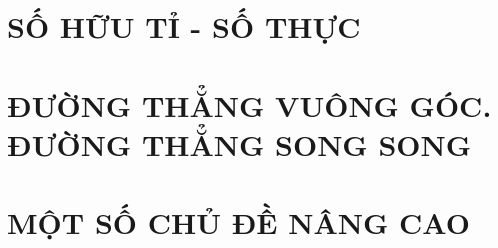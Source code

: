 \documentclass[12pt,a4paper,oneside]{book}
\theoremstyle{explain}
\theoremstyle{nonumberplain}
\begin{document}
\tableofcontents
\chapter{SỐ HỮU TỈ - SỐ THỰC}
	
	
	
	
	
	
	
\chapter{ĐƯỜNG THẲNG VUÔNG GÓC. ĐƯỜNG THẲNG SONG SONG}
	
	
	
	
	
\chapter{MỘT SỐ CHỦ ĐỀ NÂNG CAO}
	
	
\end{document}
